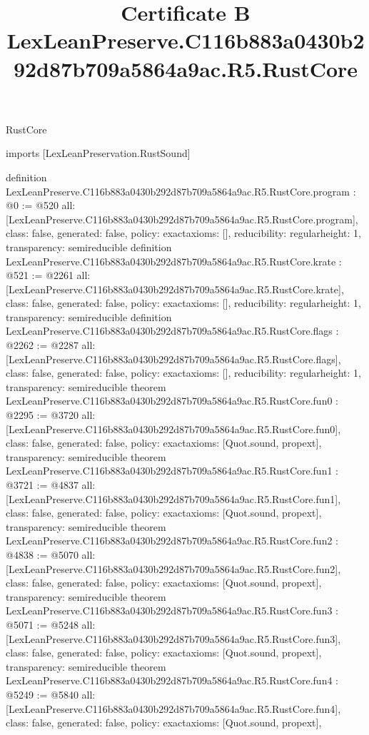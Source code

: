 \begin{lexlean}{RustCore}
\title{Certificate B LexLeanPreserve.C116b883a0430b292d87b709a5864a9ac.R5.RustCore}
\begin{coremodule}
imports [LexLeanPreservation.RustSound]

definition LexLeanPreserve.C116b883a0430b292d87b709a5864a9ac.R5.RustCore.program : @0 := @520 {
  all: [LexLeanPreserve.C116b883a0430b292d87b709a5864a9ac.R5.RustCore.program],
  class: false,
  generated: false,
  policy: exact{axioms: []},
  reducibility: regular{height: 1},
  transparency: semireducible
}
definition LexLeanPreserve.C116b883a0430b292d87b709a5864a9ac.R5.RustCore.krate : @521 := @2261 {
  all: [LexLeanPreserve.C116b883a0430b292d87b709a5864a9ac.R5.RustCore.krate],
  class: false,
  generated: false,
  policy: exact{axioms: []},
  reducibility: regular{height: 1},
  transparency: semireducible
}
definition LexLeanPreserve.C116b883a0430b292d87b709a5864a9ac.R5.RustCore.flags : @2262 := @2287 {
  all: [LexLeanPreserve.C116b883a0430b292d87b709a5864a9ac.R5.RustCore.flags],
  class: false,
  generated: false,
  policy: exact{axioms: []},
  reducibility: regular{height: 1},
  transparency: semireducible
}
theorem LexLeanPreserve.C116b883a0430b292d87b709a5864a9ac.R5.RustCore.fun0 : @2295 := @3720 {
  all: [LexLeanPreserve.C116b883a0430b292d87b709a5864a9ac.R5.RustCore.fun0],
  class: false,
  generated: false,
  policy: exact{axioms: [Quot.sound, propext]},
  transparency: semireducible
}
theorem LexLeanPreserve.C116b883a0430b292d87b709a5864a9ac.R5.RustCore.fun1 : @3721 := @4837 {
  all: [LexLeanPreserve.C116b883a0430b292d87b709a5864a9ac.R5.RustCore.fun1],
  class: false,
  generated: false,
  policy: exact{axioms: [Quot.sound, propext]},
  transparency: semireducible
}
theorem LexLeanPreserve.C116b883a0430b292d87b709a5864a9ac.R5.RustCore.fun2 : @4838 := @5070 {
  all: [LexLeanPreserve.C116b883a0430b292d87b709a5864a9ac.R5.RustCore.fun2],
  class: false,
  generated: false,
  policy: exact{axioms: [Quot.sound, propext]},
  transparency: semireducible
}
theorem LexLeanPreserve.C116b883a0430b292d87b709a5864a9ac.R5.RustCore.fun3 : @5071 := @5248 {
  all: [LexLeanPreserve.C116b883a0430b292d87b709a5864a9ac.R5.RustCore.fun3],
  class: false,
  generated: false,
  policy: exact{axioms: [Quot.sound, propext]},
  transparency: semireducible
}
theorem LexLeanPreserve.C116b883a0430b292d87b709a5864a9ac.R5.RustCore.fun4 : @5249 := @5840 {
  all: [LexLeanPreserve.C116b883a0430b292d87b709a5864a9ac.R5.RustCore.fun4],
  class: false,
  generated: false,
  policy: exact{axioms: [Quot.sound, propext]},
}
\end{coremodule}
\end{lexlean}
